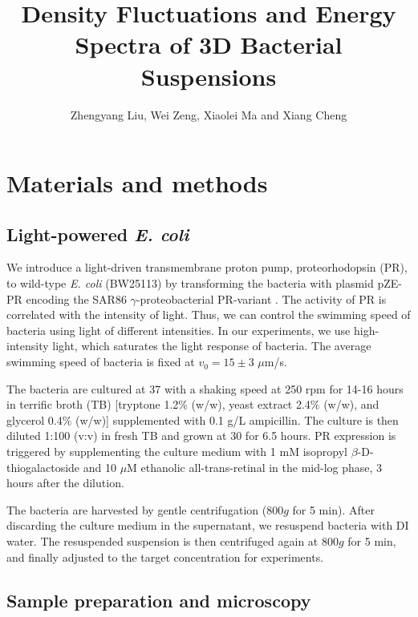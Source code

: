 \documentclass[9pt,twoside,lineno]{pnas-new}
\title{Density Fluctuations and Energy Spectra of 3D Bacterial Suspensions}
\author{Zhengyang Liu, Wei Zeng, Xiaolei Ma and Xiang Cheng}
\begin{document}


\SItext

\section{Materials and methods} \label{appendix-MM}
\subsection{Light-powered \textit{E. coli}}
We introduce a light-driven transmembrane proton pump, proteorhodopsin (PR), to wild-type \textit{E. coli} (BW25113) by transforming the bacteria with plasmid pZE-PR encoding the SAR86 $\gamma$-proteobacterial PR-variant \cite{Walter2007}. The activity of PR is correlated with the intensity of light. Thus, we can control the swimming speed of bacteria using light of different intensities. In our experiments, we use high-intensity light, which saturates the light response of bacteria. The average swimming speed of bacteria is fixed at $v_0 = 15 \pm 3$ $\mu$m/s.

The bacteria are cultured at 37 \textcelsius{} with a shaking speed at 250 rpm for 14-16 hours in terrific broth (TB) [tryptone 1.2\% (w/w), yeast extract 2.4\% (w/w), and glycerol 0.4\% (w/w)] supplemented with 0.1 g/L ampicillin. The culture is then diluted 1:100 (v:v) in fresh TB and grown at 30 \textcelsius{} for 6.5 hours. PR expression is triggered by supplementing the culture medium with 1 mM isopropyl $\beta$-D-thiogalactoside and 10  $\mu$M ethanolic all-trans-retinal in the mid-log phase, 3 hours after the dilution.

The bacteria are harvested by gentle centrifugation ($800g$ for 5 min). After discarding the culture medium in the supernatant, we resuspend bacteria with DI water. The resuspended suspension is then centrifuged again at $800g$ for 5 min, and finally adjusted to the target concentration for experiments.

\subsection{Sample preparation and microscopy}
\end{document}
